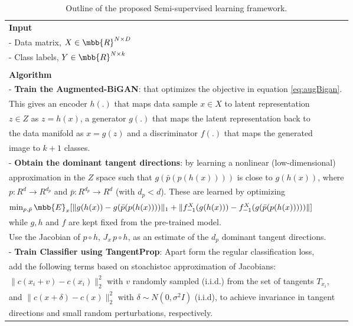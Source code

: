 \documentclass{article}
\begin{document}
{\begin{table}[h]
	\centering
	\caption{Outline of the proposed Semi-supervised learning framework.}
	\begin{tabular}{|l|}
		\hline
		\textbf{Input} \\
		- Data matrix, $X \in \mbb{R}^{N \times D}$  \\
		- Class labels, $Y \in \mbb{R}^{N \times k}$ \\ \\
		\textbf{Algorithm}\\
		\quad - \textbf{Train the Augmented-BiGAN}: that optimizes the objective in equation \ref{eq:augBigan}. \\ \quad \quad  This gives an encoder $h(.)$ that maps data sample $x \in X$ to latent representation \\ \quad \quad $z \in Z$ as $z = h(x)$, a generator $g(.)$ that maps the latent representation back to \\ \quad \quad the data manifold as $x = g(z)$ and a discriminator $f(.)$ that maps the generated \\ \quad \quad image to $k+1$ classes.\\
		\quad - \textbf{Obtain the dominant tangent directions}: by learning a nonlinear (low-dimensional) \\ \quad \quad approximation in the $Z$ space such that $g(\bar{p}(p(h(x))))$ is close to $g(h(x))$, where \\ \quad \quad $p:R^d\to R^{d_p}$ and $\bar{p}:R^{d_p}\to R^d$ (with $d_p < d$). These are learned by optimizing \\ \quad \quad  $\min_{p,\bar{p}} \mbb{E}_x [\lVert g(h(x))-g(\bar{p}(p(h(x))))\rVert_1 + \lVert f^{X}_{-1}(g(h(x))) - f^X_{-1}(g(\bar{p}(p(h(x)))))\rVert]$ \\ \quad \quad while $g,h$ and $f$ are kept fixed from the pre-trained model. \\ 
		\quad \quad Use the Jacobian of $p\circ h$, $J_x\, p\circ h$, as an estimate of the $d_p$ dominant tangent directions. \\
		\quad - \textbf{Train Classifier using TangentProp}: Apart form the regular classification loss, \\ \quad \quad add the following terms based on stoachistoc approximation of Jacobians: \\
		\quad \quad  $\lVert c(x_i+v) - c(x_i)\rVert_2^2$ with $v$ randomly sampled (i.i.d.) from the set of tangents $T_{x_i}$,\\ 
		\quad \quad and $\lVert c(x+\delta) - c(x)\rVert_2^2$ with $\delta\sim N(0,\sigma^2 I)$ (i.i.d), to achieve invariance in tangent \\ \quad \quad directions and small random perturbations, respectively.\\
		\hline
	\end{tabular}
	\label{Table:algorithm}
\end{table}
}%
\end{document}
